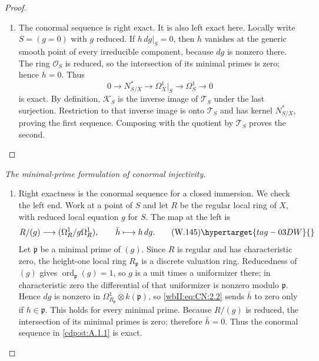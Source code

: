 \begin{proof}
\begin{enumerate}[label={$\langle1\rangle$\arabic*.},leftmargin=*]
\item 
The conormal sequence is right exact.  It is also left exact here.  Locally
write $S=(g=0)$ with $g$ reduced.  If $h\,dg|_S=0$, then $h$ vanishes at the
generic smooth point of every irreducible component, because $dg$ is nonzero
there.  The ring $\mathcal O_S$ is reduced, so the intersection of its
minimal primes is zero; hence $h=0$.  Thus
\[
0\to N^*_{S/X}\to\Omega_X^1|_S\to\Omega_S^1\to0
\]
is exact.  By definition, $\mathscr K_S$ is the inverse image of
$\mathscr T_S$ under the last surjection.  Restriction to that inverse image
is onto $\mathscr T_S$ and has kernel $N^*_{S/X}$, proving the first
sequence.  Composing with the quotient by $\mathscr T_S$ proves the second.

\end{enumerate}
\end{proof}

\begin{proof}[The minimal-prime formulation of conormal injectivity]
\begin{enumerate}[label={$\langle1\rangle$\arabic*.},leftmargin=*]
\item 
Right exactness is the conormal sequence for a closed immersion.  We check
the left end.  Work at a point of $S$ and let $R$ be the regular local ring
of $X$, with reduced local equation $g$ for $S$.  The map at the left is
\[
 R/(g)\longrightarrow (\Omega^1_R/g\Omega^1_R),
 \qquad \bar h\longmapsto h\,dg.
 \tag{W.145}\hypertarget{tag-03DW}{}\label{wbII:eq:CN:2.2}
\]
Let $\mathfrak p$ be a minimal prime of $(g)$.  Since $R$ is regular and
has characteristic zero, the height-one local ring $R_{\mathfrak p}$ is a
discrete valuation ring.  Reducedness of $(g)$ gives
$\operatorname{ord}_{\mathfrak p}(g)=1$, so $g$ is a unit times a
uniformizer there; in characteristic zero the differential of that
uniformizer is nonzero modulo $\mathfrak p$.  Hence $dg$ is nonzero in
$\Omega^1_{R_{\mathfrak p}}\otimes k(\mathfrak p)$, so \eqref{wbII:eq:CN:2.2} sends $\bar h$
to zero only if $h\in\mathfrak p$.  This holds for every minimal prime.
Because $R/(g)$ is reduced, the intersection of its minimal primes is zero;
therefore $\bar h=0$.  Thus the conormal sequence in \cref{cdp:st:A.1.1} is exact.

\end{enumerate}
\end{proof}

